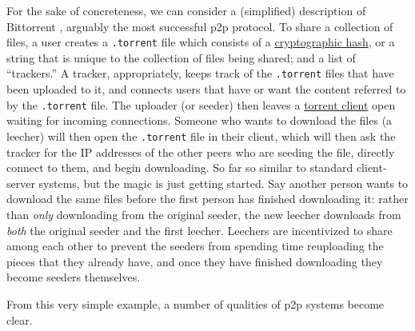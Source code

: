 \documentclass[11pt]{article}
\begin{document}
\begin{multicols}{2}
For the sake of concreteness, we can consider a (simplified) description
of Bittorrent \cite{cohenBitTorrentProtocolSpecification2017} ,
arguably the most successful p2p protocol. To share a collection of
files, a user creates a \texttt{.torrent} file which consists of a
\href{https://en.wikipedia.org/wiki/Cryptographic_hash_function}{cryptographic
hash}, or a string that is unique to the collection of files being
shared; and a list of ``trackers.'' A tracker, appropriately, keeps
track of the \texttt{.torrent} files that have been uploaded to it, and
connects users that have or want the content referred to by the
\texttt{.torrent} file. The uploader (or seeder) then leaves a
\href{https://en.wikipedia.org/wiki/Glossary_of_BitTorrent_terms\#Client}{torrent
client} open waiting for incoming connections. Someone who wants to
download the files (a leecher) will then open the \texttt{.torrent} file
in their client, which will then ask the tracker for the IP addresses of
the other peers who are seeding the file, directly connect to them, and
begin downloading. So far so similar to standard client-server systems,
but the magic is just getting started. Say another person wants to
download the same files before the first person has finished downloading
it: rather than \emph{only} downloading from the original seeder, the
new leecher downloads from \emph{both} the original seeder and the first
leecher. Leechers are incentivized to share among each other to prevent
the seeders from spending time reuploading the pieces that they already
have, and once they have finished downloading they become seeders
themselves.

From this very simple example, a number of qualities of p2p systems
become clear.

\begin{itemize}


\end{itemize}
\end{multicols}
\end{document}

